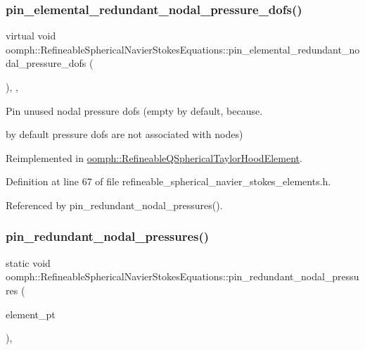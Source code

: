 \subsubsection{\texorpdfstring{pin\+\_\+elemental\+\_\+redundant\+\_\+nodal\+\_\+pressure\+\_\+dofs()}{pin\_elemental\_redundant\_nodal\_pressure\_dofs()}}
{\footnotesize\ttfamily virtual void oomph\+::\+Refineable\+Spherical\+Navier\+Stokes\+Equations\+::pin\+\_\+elemental\+\_\+redundant\+\_\+nodal\+\_\+pressure\+\_\+dofs (\begin{DoxyParamCaption}{ }\end{DoxyParamCaption})\hspace{0.3cm}{\ttfamily [inline]}, {\ttfamily [protected]}, {\ttfamily [virtual]}}



Pin unused nodal pressure dofs (empty by default, because. 

by default pressure dofs are not associated with nodes) 

Reimplemented in \hyperlink{classoomph_1_1RefineableQSphericalTaylorHoodElement_a0aa5d5880b277ae6f4711b54e4b28203}{oomph\+::\+Refineable\+Q\+Spherical\+Taylor\+Hood\+Element}.



Definition at line 67 of file refineable\+\_\+spherical\+\_\+navier\+\_\+stokes\+\_\+elements.\+h.



Referenced by pin\+\_\+redundant\+\_\+nodal\+\_\+pressures().

\mbox{\label{classoomph_1_1RefineableSphericalNavierStokesEquations_a81a103da44cf4cfae541bd5cbe2518f8}} 
\subsubsection{\texorpdfstring{pin\+\_\+redundant\+\_\+nodal\+\_\+pressures()}{pin\_redundant\_nodal\_pressures()}}
{\footnotesize\ttfamily static void oomph\+::\+Refineable\+Spherical\+Navier\+Stokes\+Equations\+::pin\+\_\+redundant\+\_\+nodal\+\_\+pressures (\begin{DoxyParamCaption}\item[{const \hyperlink{classoomph_1_1Vector}{Vector}$<$ \hyperlink{classoomph_1_1GeneralisedElement}{Generalised\+Element} $\ast$$>$ \&}]{element\+\_\+pt }\end{DoxyParamCaption})\hspace{0.3cm}{\ttfamily [inline]}, {\ttfamily [static]}}



